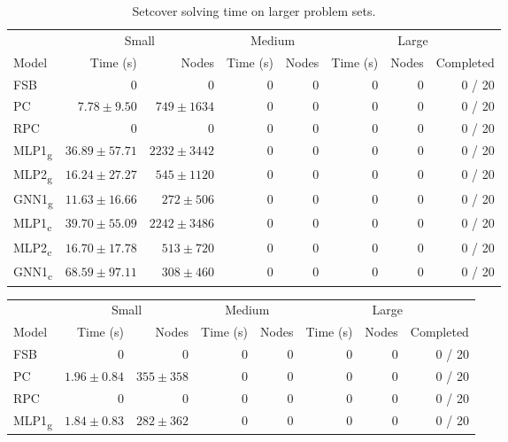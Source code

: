 \begin{scriptsize}
\begin{table}[ht]
	\centering
	\begin{tabular}{lrrrrrrr}
		\toprule
		& \multicolumn{2}{c}{Small} & \multicolumn{2}{c}{Medium} & \multicolumn{3}{c}{Large}\\ \cmidrule(lr){2-3} \cmidrule(lr){4-5} \cmidrule(lr){6-8}
		Model & Time (s) & Nodes  & Time (s) & Nodes & Time (s) & Nodes & Completed\\
		\midrule
		FSB & 0 & 0 & 0 & 0 & 0 & 0 & 0 / 20\\
		PC  & $7.78 \pm 9.50$ & $749 \pm 1634$ & 0 & 0 & 0 & 0 & 0 / 20\\
		RPC & 0 & 0 & 0 & 0 & 0 & 0 & 0 / 20\\
		\addlinespace
		MLP1\textsubscript{g} & $36.89 \pm 57.71$ & $2232 \pm 3442$ & 0 & 0 & 0 & 0 & 0 / 20\\
		MLP2\textsubscript{g} & $16.24 \pm 27.27$ & $545 \pm 1120$ & 0 & 0 & 0 & 0 & 0 / 20\\
		GNN1\textsubscript{g} & $11.63 \pm 16.66$ & $272 \pm 506 $& 0 & 0 & 0 & 0 & 0 / 20\\
		\addlinespace
		MLP1\textsubscript{c} & $39.70 \pm 55.09$ & $2242 \pm 3486$ & 0 & 0 & 0 & 0 & 0 / 20\\
		MLP2\textsubscript{c} & $16.70 \pm 17.78$ & $513 \pm 720$ & 0 & 0 & 0 & 0 & 0 / 20\\
		GNN1\textsubscript{c} & $68.59 \pm 97.11$ & $308 \pm 460$ & 0 & 0 & 0 & 0 & 0 / 20\\
		\bottomrule
	\end{tabular}
	\caption{Setcover solving time on larger problem sets.}\label{tab:results_trans_set}
\end{table}
\begin{table}[ht]
	\centering
	\begin{tabular}{lrrrrrrr}
	    \toprule
		& \multicolumn{2}{c}{Small} & \multicolumn{2}{c}{Medium} & \multicolumn{3}{c}{Large}\\ \cmidrule(lr){2-3} \cmidrule(lr){4-5} \cmidrule(lr){6-8}
		Model & Time (s) & Nodes  & Time (s) & Nodes & Time (s) & Nodes & Completed\\
		\midrule
		FSB & 0 & 0 & 0 & 0 & 0 & 0 & 0 / 20\\
		PC  & $1.96 \pm 0.84$ & $355 \pm 358$ & 0 & 0 & 0 & 0 & 0 / 20\\
		RPC & 0 & 0 & 0 & 0 & 0 & 0 & 0 / 20\\
		\addlinespace
		MLP1\textsubscript{g} & $1.84 \pm 0.83$ & $282 \pm 362$ & 0 & 0 & 0 & 0 & 0 / 20\\

\end{tabular}
\end{table}
\end{scriptsize}
